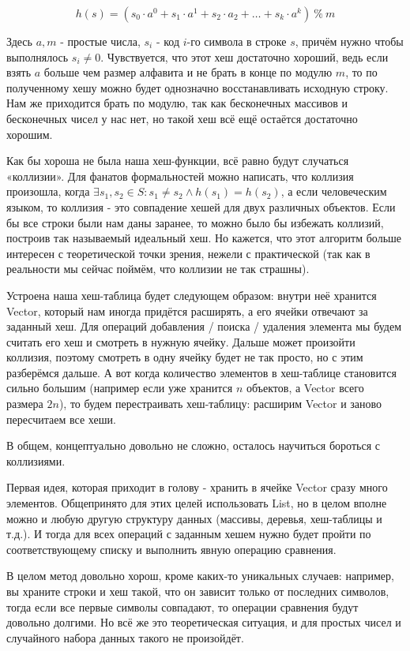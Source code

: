 $$h(s) = (s_0 \cdot a^0 + s_1 \cdot a^1 + s_2 \cdot a_2 + \ldots + s_k \cdot a^k)\ \% \ m$$

Здесь $a, m$ - простые числа, $s_i$ - код $i$-го символа в строке $s$, причём нужно чтобы выполнялось $s_i \ne 0$. Чувствуется, что этот хеш достаточно хороший, ведь если взять $a$ больше чем размер алфавита и не брать в конце по модулю $m$, то по полученному хешу можно будет однозначно восстанавливать исходную строку. Нам же приходится брать по модулю, так как бесконечных массивов и бесконечных чисел у нас нет, но такой хеш всё ещё остаётся достаточно хорошим.


Как бы хороша не была наша хеш-функции, всё равно будут случаться «коллизии». Для фанатов формальностей можно написать, что коллизия произошла, когда $\exists s_1, s_2 \in S: s_1 \ne s_2 \land h(s_1) = h(s_2)$, а если человеческим языком, то коллизия - это совпадение хешей для двух различных объектов. Если бы все строки были нам даны заранее, то можно было бы избежать коллизий, построив так называемый идеальный хеш. Но кажется, что этот алгоритм больше интересен с теоретической точки зрения, нежели с практической (так как в реальности мы сейчас поймём, что коллизии не так страшны).

Устроена наша хеш-таблица будет следующем образом: внутри неё хранится Vector, который нам иногда придётся расширять, а его ячейки отвечают за заданный хеш. Для операций добавления / поиска / удаления элемента мы будем считать его хеш и смотреть в нужную ячейку. Дальше может произойти коллизия, поэтому смотреть в одну ячейку будет не так просто, но с этим разберёмся дальше. А вот когда количество элементов в хеш-таблице становится сильно большим (например если уже хранится $n$ объектов, а Vector всего размера $2n$), то будем перестраивать хеш-таблицу: расширим Vector и заново пересчитаем все хеши.

В общем, концептуально довольно не сложно, осталось научиться бороться с коллизиями.


Первая идея, которая приходит в голову - хранить в ячейке Vector сразу много элементов. Общепринято для этих целей использовать List, но в целом вполне можно и любую другую структуру данных (массивы, деревья, хеш-таблицы и т.д.). И тогда для всех операций с заданным хешем нужно будет пройти по соответствующему списку и выполнить явную операцию сравнения.

В целом метод довольно хорош, кроме каких-то уникальных случаев: например, вы храните строки и хеш такой, что он зависит только от последних символов, тогда если все первые символы совпадают, то операции сравнения будут довольно долгими. Но всё же это теоретическая ситуация, и для простых чисел и случайного набора данных такого не произойдёт.


